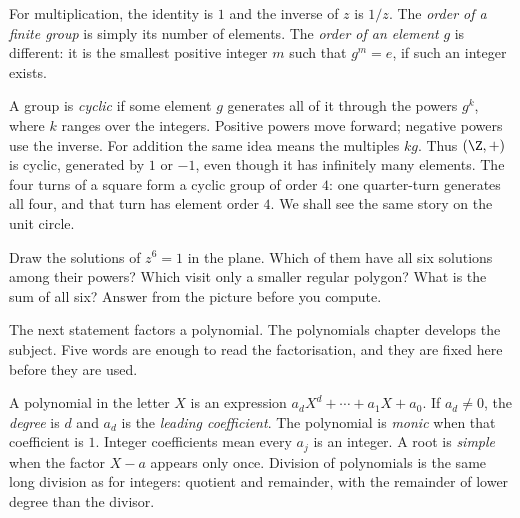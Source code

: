 For multiplication, the identity is $1$ and the inverse of $z$ is $1/z$. The \emph{order of a finite group} is simply its number of elements. The \emph{order of an element} $g$ is different: it is the smallest positive integer $m$ such that $g^m=e$, if such an integer exists.

A group is \emph{cyclic} if some element $g$ generates all of it through the powers $g^k$, where $k$ ranges over the integers. Positive powers move forward; negative powers use the inverse. For addition the same idea means the multiples $kg$. Thus $(\Z,+)$ is cyclic, generated by $1$ or $-1$, even though it has infinitely many elements. The four turns of a square form a cyclic group of order $4$: one quarter-turn generates all four, and that turn has element order $4$. We shall see the same story on the unit circle.

\begin{think}
Draw the solutions of $z^6=1$ in the plane. Which of them have all six solutions among their powers? Which visit only a smaller regular polygon? What is the sum of all six? Answer from the picture before you compute.
\end{think}

The next statement factors a polynomial. The polynomials chapter develops the subject. Five words are enough to read the factorisation, and they are fixed here before they are used.

\begin{definitionx}
A polynomial in the letter $X$ is an expression $a_d X^d+\cdots+a_1 X+a_0$. If $a_d\ne 0$, the \emph{degree} is $d$ and $a_d$ is the \emph{leading coefficient}. The polynomial is \emph{monic} when that coefficient is $1$. Integer coefficients mean every $a_j$ is an integer. A root is \emph{simple} when the factor $X-a$ appears only once. Division of polynomials is the same long division as for integers: quotient and remainder, with the remainder of lower degree than the divisor.
\end{definitionx}

